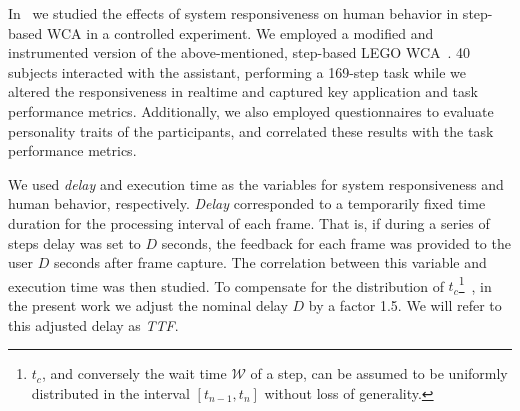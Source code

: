In~\cite{olguinmunoz:impact2021} we studied the effects of system responsiveness on human behavior in step-based \ac{WCA} in a controlled experiment.
We employed a modified and instrumented version of the above-mentioned, step-based LEGO \ac{WCA}~\cite{Chen2015LEGO}.
\num{40} subjects interacted with the assistant, performing a \num{169}-step task while we altered the responsiveness in realtime and captured key application and task performance metrics.
Additionally, we also employed questionnaires to evaluate personality traits of the participants, and correlated these results with the task performance metrics.

We used \emph{delay} and execution time as the variables for system responsiveness and human behavior, respectively.
\emph{Delay} corresponded to a temporarily fixed time duration for the processing interval of each frame.
That is, if during a series of steps delay was set to \( D \) seconds, the feedback for each frame was provided to the user \( D \) seconds after frame capture.
The correlation between this variable and execution time was then studied.
To compensate for the distribution of \( t_c \)\footnote{\( t_c \), and conversely the wait time \( \mathcal{W} \) of a step, can be assumed to be uniformly distributed in the interval \( [t_{n - 1}, t_n] \) without loss of generality.}~\cite{olguinmunoz:impact2021}, in the present work we adjust the nominal delay \( D \) by a factor \num{1.5}.
We will refer to this adjusted delay as \emph{\acf{TTF}}.



